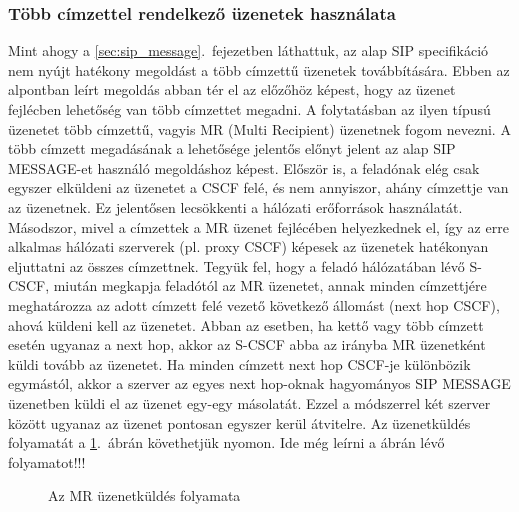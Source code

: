 \subsubsection{Több címzettel rendelkező üzenetek használata}
Mint ahogy a \ref{sec:sip_message}.~fejezetben láthattuk, az alap SIP specifikáció nem nyújt hatékony megoldást a több címzettű üzenetek továbbítására. Ebben az alpontban leírt megoldás abban tér el az előzőhöz képest, hogy az üzenet fejlécben lehetőség van több címzettet megadni. A folytatásban az ilyen típusú üzenetet több címzettű, vagyis MR (Multi Recipient) üzenetnek fogom nevezni. A több címzett megadásának a lehetősége jelentős előnyt jelent az alap SIP MESSAGE-et használó megoldáshoz képest. Először is, a feladónak elég csak egyszer elküldeni az üzenetet a CSCF felé, és nem annyiszor, ahány címzettje van az üzenetnek. Ez jelentősen lecsökkenti a hálózati erőforrások használatát. Másodszor, mivel a címzettek a MR üzenet fejlécében helyezkednek el, így az erre alkalmas hálózati szerverek (pl. proxy CSCF) képesek az üzenetek hatékonyan eljuttatni az összes címzettnek. Tegyük fel, hogy a feladó hálózatában lévő S-CSCF, miután megkapja feladótól az MR üzenetet, annak minden címzettjére meghatározza az adott címzett felé vezető következő állomást (next hop CSCF), ahová küldeni kell az üzenetet. Abban az esetben, ha kettő vagy több címzett esetén ugyanaz a next hop, akkor az S-CSCF abba az irányba MR üzenetként küldi tovább az üzenetet. Ha minden címzett next hop CSCF-je különbözik egymástól, akkor a szerver az egyes next hop-oknak hagyományos SIP MESSAGE üzenetben küldi el az üzenet egy-egy másolatát. Ezzel a módszerrel két szerver között ugyanaz az üzenet pontosan egyszer kerül átvitelre. Az üzenetküldés folyamatát a \ref{fig:mrflow}.~ábrán követhetjük nyomon. Ide még leírni a ábrán lévő folyamatot!!!
\begin{figure}[htbp]
\center
{}
\caption{Az MR üzenetküldés folyamata}
\label{fig:mrflow}
\end{figure}

